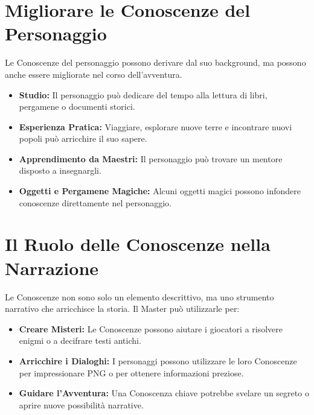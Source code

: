 \documentclass[../manuale_main.tex]{subfiles}
\begin{document}
\vspace{0.3cm}

\section{Migliorare le Conoscenze del Personaggio}
Le Conoscenze del personaggio possono derivare dal suo background, ma possono anche essere migliorate nel corso dell’avventura.

\begin{itemize}
    \item \textbf{Studio:} Il personaggio può dedicare del tempo alla lettura di libri, pergamene o documenti storici.
    
    \item \textbf{Esperienza Pratica:} Viaggiare, esplorare nuove terre e incontrare nuovi popoli può arricchire il suo sapere.
    
    \item \textbf{Apprendimento da Maestri:} Il personaggio può trovare un mentore disposto a insegnargli.
    
    \item \textbf{Oggetti e Pergamene Magiche:} Alcuni oggetti magici possono infondere conoscenze direttamente nel personaggio.
\end{itemize}

\vspace{0.3cm}

\section{Il Ruolo delle Conoscenze nella Narrazione}
Le Conoscenze non sono solo un elemento descrittivo, ma uno strumento narrativo che arricchisce la storia. Il Master può utilizzarle per:

\begin{itemize}
    \item \textbf{Creare Misteri:} Le Conoscenze possono aiutare i giocatori a risolvere enigmi o a decifrare testi antichi.
    \item \textbf{Arricchire i Dialoghi:} I personaggi possono utilizzare le loro Conoscenze per impressionare PNG o per ottenere informazioni preziose.
    \item \textbf{Guidare l'Avventura:} Una Conoscenza chiave potrebbe svelare un segreto o aprire nuove possibilità narrative.
\end{itemize}
\end{document}
